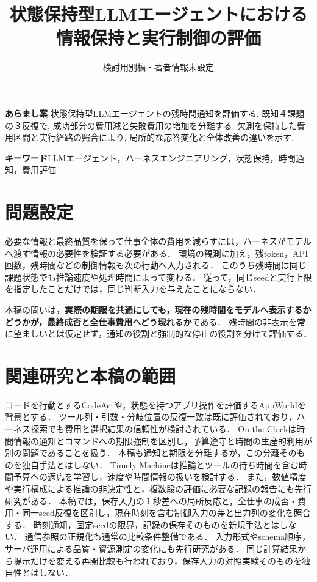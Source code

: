 \documentclass[uplatex,a4paper,twocolumn,10pt]{jsarticle}
\title{状態保持型LLMエージェントにおける\newline 情報保持と実行制御の評価}
\author{検討用別稿・著者情報未設定}
\date{}
\begin{document}
\raggedbottom
\maketitle
\noindent\textbf{あらまし案}\quad
状態保持型LLMエージェントの残時間通知を評価する. 既知４課題の３反復で, 成功部分の費用減と失敗費用の増加を分離する. 欠測を保持した費用区間と実行経路の照合により, 局所的な応答変化と全体改善の違いを示す.

\noindent\textbf{キーワード}\quad LLMエージェント，ハーネスエンジニアリング，状態保持，時間通知，費用評価

\section{問題設定}
必要な情報と最終品質を保って仕事全体の費用を減らすには，ハーネスがモデルへ渡す情報の必要性を検証する必要がある．
環境の観測に加え，残token，API回数，残時間などの制御情報も次の行動へ入力される．
このうち残時間は同じ課題状態でも推論速度や処理時間によって変わる．
従って，同じseedと実行上限を指定したことだけでは，同じ判断入力を与えたことにならない．

本稿の問いは，\textbf{実際の期限を共通にしても，現在の残時間をモデルへ表示するかどうかが，最終成否と全仕事費用へどう現れるか}である．
残時間の非表示を常に望ましいとは仮定せず，通知の役割と強制的な停止の役割を分けて評価する．

\section{関連研究と本稿の範囲}
コードを行動とするCodeAct\cite{codeact}や，状態を持つアプリ操作を評価するAppWorld\cite{appworld}を背景とする．
ツール列・引数・分岐位置の反復一致は既に評価されており\cite{consistency}，ハーネス探索でも費用と選択結果の信頼性が検討されている\cite{beyondprompts}．
On the Clock\cite{clock}は時間情報の通知とコマンドへの期限強制を区別し，予算遵守と時間の生産的利用が別の問題であることを扱う．
本稿も通知と期限を分離するが，この分離そのものを独自手法とはしない．
Timely Machine\cite{timely}は推論とツールの待ち時間を含む時間予算への適応を学習し，速度や時間情報の扱いを検討する．
また，数値精度や実行構成による推論の非決定性\cite{nondeterminism}と，複数段の評価に必要な記録の報告\cite{repro}にも先行研究がある．
本稿では，保存入力の１秒差への局所反応と，全仕事の成否・費用・同一seed反復を区別し，現在時刻を含む制御入力の差と出力列の変化を照合する．
時刻通知，固定seedの限界，記録の保存そのものを新規手法とはしない．
通信参照の正規化も通常の比較条件整備である．
入力形式やschema順序，サーバ運用による品質・資源測定の変化にも先行研究がある\cite{localprotocol}．
同じ計算結果から提示だけを変える再開比較も行われており\cite{delivery}，保存入力の対照実験そのものを独自性とはしない．
\end{document}
